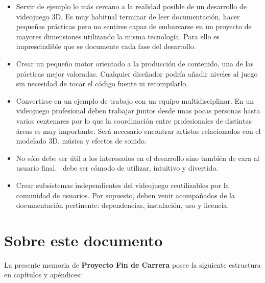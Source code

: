 \begin{itemize}
    \item Servir de ejemplo lo más cercano a la realidad posible de un
    desarrollo de videojuego 3D. Es muy habitual terminar de leer documentación,
    hacer pequeñas prácticas pero no sentirse capaz de embarcarse en un
    proyecto de mayores dimensiones utilizando la misma tecnología. Para ello
    es imprescindible que se documente cada fase del desarrollo.
    \item Crear un pequeño motor orientado a la producción de contenido, una
    de las prácticas mejor valoradas. Cualquier diseñador podría añadir
    niveles al juego sin necesidad de tocar el código fuente ni recompilarlo.
    \item Convertirse en un ejemplo de trabajo con un equipo multidisciplinar.
    En un videojuego profesional deben trabajar juntos desde unas pocas personas
    hasta varios centenares por lo que la coordinación entre profesionales
    de distintas áreas es muy importante. Será necesario encontrar artistas
    relacionados con el modelado 3D, música y efectos de sonido.
    \item No sólo debe ser útil a los interesados en el desarrollo sino también
    de cara al usuario final. \juego\ debe ser cómodo de utilizar, intuitivo
    y divertido.
    \item Crear subsistemas independientes del videojuego reutilizables
    por la comunidad de usuarios. Por supuesto, deben venir acompañados
    de la documentación pertinente: dependencias, instalación, uso y licencia.
\end{itemize}

\section{Sobre este documento}

La presente memoria de \textbf{Proyecto Fin de Carrera} posee la siguiente
estructura en capítulos y apéndices:

